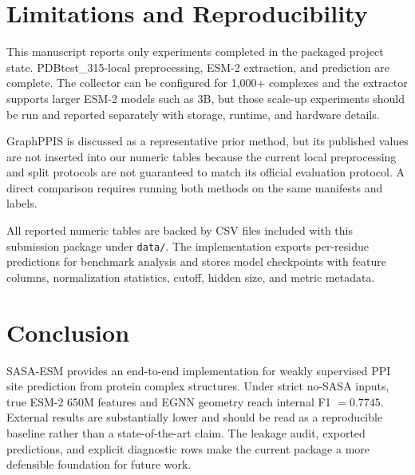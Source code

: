 \documentclass[runningheads]{llncs}
\begin{document}
\section{Limitations and Reproducibility}

This manuscript reports only experiments completed in the packaged project state.
PDBtest\_315-local preprocessing, ESM-2 extraction, and prediction are complete. The
collector can be configured for 1,000+ complexes and the extractor supports larger ESM-2
models such as 3B, but those scale-up experiments should be run and reported separately
with storage, runtime, and hardware details.

GraphPPIS is discussed as a representative prior method, but its published values are
not inserted into our numeric tables because the current local preprocessing and split
protocols are not guaranteed to match its official evaluation protocol. A direct
comparison requires running both methods on the same manifests and labels.

All reported numeric tables are backed by CSV files included with this submission
package under \texttt{data/}. The implementation exports per-residue predictions for
benchmark analysis and stores model checkpoints with feature columns, normalization
statistics, cutoff, hidden size, and metric metadata.

\section{Conclusion}

SASA-ESM provides an end-to-end implementation for weakly supervised PPI site
prediction from protein complex structures. Under strict no-SASA inputs, true ESM-2
650M features and EGNN geometry reach internal F1 \(=0.7745\). External results are
substantially lower and should be read as a reproducible baseline rather than a
state-of-the-art claim. The leakage audit, exported predictions, and explicit diagnostic
rows make the current package a more defensible foundation for future work.



\end{document}
